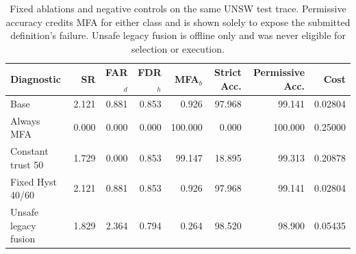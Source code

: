\begin{table}[!htbp]
\centering
\caption{Fixed ablations and negative controls on the same UNSW test trace. Permissive accuracy credits MFA for either class and is shown solely to expose the submitted definition's failure. Unsafe legacy fusion is offline only and was never eligible for selection or execution.}
\label{tab:supp_diagnostics}
\scriptsize
\setlength{\tabcolsep}{3pt}
\begin{tabular}{lrrrrrrr}
\toprule
Diagnostic & SR & FAR$_d$ & FDR$_h$ & MFA$_b$ & Strict Acc. & Permissive Acc. & Cost\\
\midrule
Base & 2.121 & 0.881 & 0.853 & 0.926 & 97.968 & 99.141 & 0.02804 \\
Always MFA & 0.000 & 0.000 & 0.000 & 100.000 & 0.000 & 100.000 & 0.25000 \\
Constant trust 50 & 1.729 & 0.000 & 0.853 & 99.147 & 18.895 & 99.313 & 0.20878 \\
Fixed Hyst 40/60 & 2.121 & 0.881 & 0.853 & 0.926 & 97.968 & 99.141 & 0.02804 \\
Unsafe legacy fusion & 1.829 & 2.364 & 0.794 & 0.264 & 98.520 & 98.900 & 0.05435 \\
\bottomrule
\end{tabular}
\end{table}
